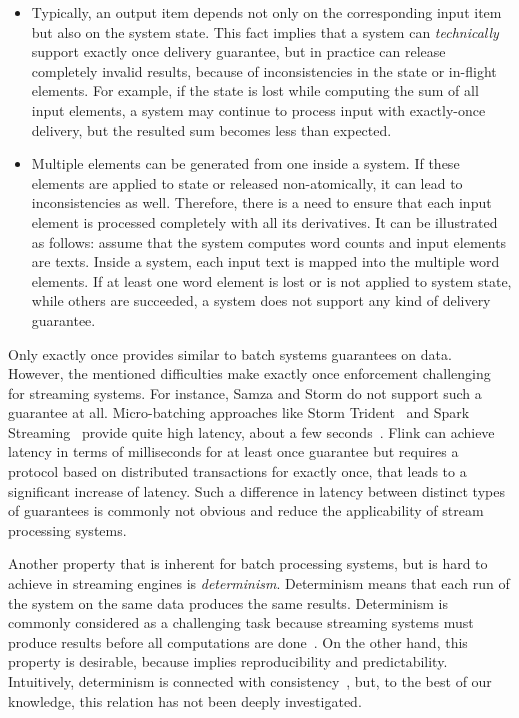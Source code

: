 \begin{itemize}
    \item Typically, an output item depends not only on the corresponding input item but also on the system state. This fact implies that a system can {\em technically} support exactly once delivery guarantee, but in practice can release completely invalid results, because of inconsistencies in the state or in-flight elements. For example, if the state is lost while computing the sum of all input elements, a system may continue to process input with exactly-once delivery, but the resulted sum becomes less than expected. 
    \item Multiple elements can be generated from one inside a system. If these elements are applied to state or released non-atomically, it can lead to inconsistencies as well. Therefore, there is a need to ensure that each input element is processed completely with all its derivatives. It can be illustrated as follows: assume that the system computes word counts and input elements are texts. Inside a system, each input text is mapped into the multiple word elements. If at least one word element is lost or is not applied to system state, while others are succeeded, a system does not support any kind of delivery guarantee. 
\end{itemize}

Only exactly once provides similar to batch systems guarantees on data. However, the mentioned difficulties make exactly once enforcement challenging for streaming systems. For instance, Samza and Storm do not support such a guarantee at all. Micro-batching approaches like Storm Trident~\cite{apache:storm:trident} and Spark Streaming~\cite{Zaharia:2012:DSE:2342763.2342773} provide quite high latency, about a few seconds~\cite{7530084, 7474816}. Flink can achieve latency in terms of milliseconds for at least once guarantee but requires a protocol based on distributed transactions for exactly once, that leads to a significant increase of latency. Such a difference in latency between distinct types of guarantees is commonly not obvious and reduce the applicability of stream processing systems.

Another property that is inherent for batch processing systems, but is hard to achieve in streaming engines is {\em determinism}. Determinism means that each run of the system on the same data produces the same results. Determinism is commonly considered as a challenging task because streaming systems must produce results before all computations are done~\cite{Zacheilas:2017:MDS:3093742.3093921}. On the other hand, this property is desirable, because implies reproducibility and predictability. Intuitively, determinism is connected with consistency~\cite{Stonebraker:2005:RRS:1107499.1107504}, but, to the best of our knowledge, this relation has not been deeply investigated. 

